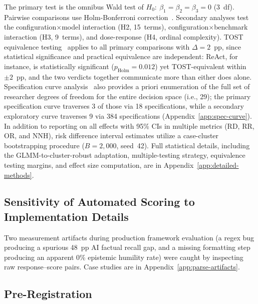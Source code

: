 \documentclass[preprint]{article}
\begin{document}
\noindent The primary test is the omnibus Wald test of $H_0{:}\ \beta_1 = \beta_2 = \beta_3 = 0$ (3~df).  Pairwise comparisons use Holm-Bonferroni correction~\cite{holm1979simple}.  Secondary analyses test the configuration$\times$model interaction (H2, 15~terms), configuration$\times$benchmark interaction (H3, 9~terms), and dose-response (H4, ordinal complexity).  TOST equivalence testing~\cite{schuirmann1987tost, lakens2017equivalence} applies to all primary comparisons with $\Delta = 2$~pp, since statistical significance and practical equivalence are independent: ReAct, for instance, is statistically significant ($p_{\text{Holm}} = 0.012$) yet TOST-equivalent within $\pm 2$~pp, and the two verdicts together communicate more than either does alone.  Specification curve analysis~\cite{simonsohn2020specification} also provides a priori enumeration of the full set of researcher degrees of freedom for the entire decision space (i.e., 29); the primary specification curve traverses 3 of those via 18 specifications, while a secondary exploratory curve traverses 9 via 384 specifications (Appendix~\ref{app:spec-curve}).  In addition to reporting on all effects with 95\% CIs in multiple metrics (RD, RR, OR, and NNH), risk difference interval estimates utilize a case-cluster bootstrapping procedure ($B = 2{,}000$, seed~42).  Full statistical details, including the GLMM-to-cluster-robust adaptation, multiple-testing strategy, equivalence testing margins, and effect size computation, are in Appendix~\ref{app:detailed-methods}.

\subsection{Sensitivity of Automated Scoring to Implementation Details}
\label{sec:scoring-sensitivity}

Two measurement artifacts during production framework evaluation (a regex bug producing a spurious 48~pp AI factual recall gap, and a missing formatting step producing an apparent 0\% epistemic humility rate) were caught by inspecting raw response--score pairs.  Case studies are in Appendix~\ref{app:parse-artifacts}.

\subsection{Pre-Registration}
\label{sec:prereg}
\end{document}
